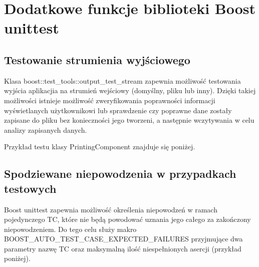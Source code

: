 \documentclass[12pt,a4paper,notitlepage]{report}
\begin{document}
\section{Dodatkowe funkcje biblioteki Boost unittest}

\subsection{Testowanie strumienia wyjściowego}

Klasa boost::test{\_}tools::output{\_}test{\_}stream zapewnia możliwość testowania wyjścia aplikacjia na strumień wejściowy (domyślny, pliku lub inny). Dzięki takiej możliwości istnieje możliwość zweryfikowania poprawności informacji wyświetlanych użytkownikowi lub sprawdzenie czy poprawne dane zostały zapisane do pliku bez konieczności jego tworzeni, a następnie wczytywania w celu analizy zapisanych danych.

Przykład testu klasy PrintingComponent znajduje się poniżej.

			

\subsection{Spodziewane niepowodzenia w przypadkach testowych}

Boost unittest zapewnia możliwość określenia niepowodzeń w ramach pojedynczego TC, które nie będą powodować uznania jego całego za zakończony niepowodzeniem. Do tego celu służy makro BOOST{\_}AUTO{\_}TEST{\_}CASE{\_}EXPECTED{\_}FAILURES przyjmujące dwa parametry nazwę TC oraz maksymalną ilość niespełnionych asercji (przykład poniżej).

			
\end{document}
